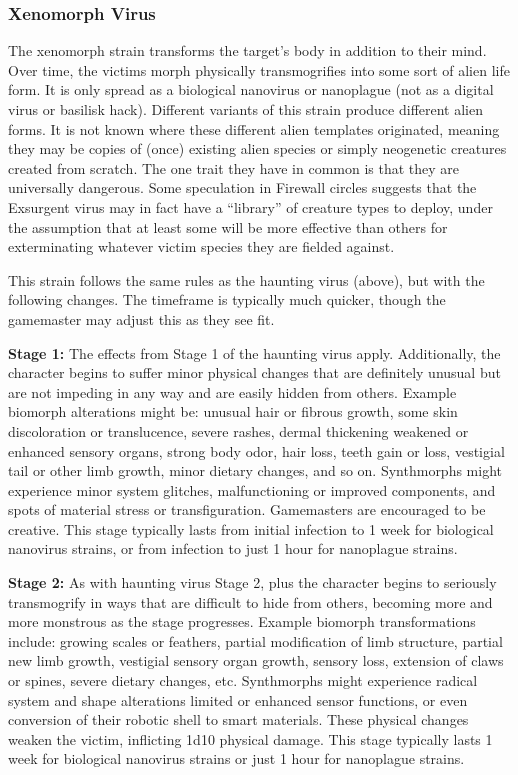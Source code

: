 \subsubsection{Xenomorph Virus} 

The xenomorph strain transforms the target's body in addition to their mind. Over time, the victims morph physically transmogrifies into some sort of alien life form. It is only spread as a biological nanovirus or nanoplague (not as a digital virus or basilisk hack). Different variants of this strain produce different alien forms. It is not known where these different alien templates originated, meaning they may be copies of (once) existing alien species or simply neogenetic creatures created from scratch. The one trait they have in common is that they are universally dangerous. Some speculation in Firewall circles suggests that the Exsurgent virus may in fact have a ``library'' of creature types to deploy, under the assumption that at least some will be more effective than others for exterminating whatever victim species they are fielded against. 

This strain follows the same rules as the haunting virus (above), but with the following changes. The timeframe is typically much quicker, though the gamemaster may adjust this as they see fit. 

\textbf{Stage 1:} The effects from Stage 1 of the haunting virus apply. Additionally, the character begins to suffer minor physical changes that are definitely unusual but are not impeding in any way and are easily hidden from others. Example biomorph alterations might be: unusual hair or fibrous growth, some skin discoloration or translucence, severe rashes, dermal thickening weakened or enhanced sensory organs, strong body odor, hair loss, teeth gain or loss, vestigial tail or other limb growth, minor dietary changes, and so on. Synthmorphs might experience minor system glitches, malfunctioning or improved components, and spots of material stress or transfiguration. Gamemasters are encouraged to be creative. This stage typically lasts from initial infection to 1 week for biological nanovirus strains, or from infection to just 1 hour for nanoplague strains. 

\textbf{Stage 2:} As with haunting virus Stage 2, plus the character begins to seriously transmogrify in ways that are difficult to hide from others, becoming more and more monstrous as the stage progresses. Example biomorph transformations include: growing scales or feathers, partial modification of limb structure, partial new limb growth, vestigial sensory organ growth, sensory loss, extension of claws or spines, severe dietary changes, etc. Synthmorphs might experience radical system and shape alterations limited or enhanced sensor functions, or even conversion of their robotic shell to smart materials. These physical changes weaken the victim, inflicting 1d10 physical damage. This stage typically lasts 1 week for biological nanovirus strains or just 1 hour for nanoplague strains. 

